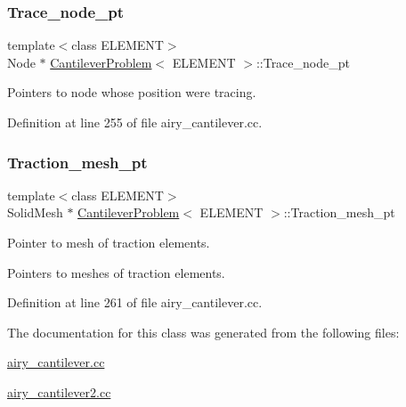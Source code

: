 \mbox{\label{classCantileverProblem_a7b91e041c3e5336b62ced10774917370}} 
\subsubsection{\texorpdfstring{Trace\+\_\+node\+\_\+pt}{Trace\_node\_pt}}
{\footnotesize\ttfamily template$<$class E\+L\+E\+M\+E\+NT$>$ \\
Node $\ast$ \hyperlink{classCantileverProblem}{Cantilever\+Problem}$<$ E\+L\+E\+M\+E\+NT $>$\+::Trace\+\_\+node\+\_\+pt\hspace{0.3cm}{\ttfamily [private]}}



Pointers to node whose position we\textquotesingle{}re tracing. 



Definition at line 255 of file airy\+\_\+cantilever.\+cc.

\mbox{\label{classCantileverProblem_a52485434aab5d653010c48a0b0f89088}} 
\subsubsection{\texorpdfstring{Traction\+\_\+mesh\+\_\+pt}{Traction\_mesh\_pt}}
{\footnotesize\ttfamily template$<$class E\+L\+E\+M\+E\+NT$>$ \\
Solid\+Mesh $\ast$ \hyperlink{classCantileverProblem}{Cantilever\+Problem}$<$ E\+L\+E\+M\+E\+NT $>$\+::Traction\+\_\+mesh\+\_\+pt\hspace{0.3cm}{\ttfamily [private]}}



Pointer to mesh of traction elements. 

Pointers to meshes of traction elements. 

Definition at line 261 of file airy\+\_\+cantilever.\+cc.



The documentation for this class was generated from the following files\+:\begin{DoxyCompactItemize}
\item 
\hyperlink{airy__cantilever_8cc}{airy\+\_\+cantilever.\+cc}\item 
\hyperlink{airy__cantilever2_8cc}{airy\+\_\+cantilever2.\+cc}\end{DoxyCompactItemize}
